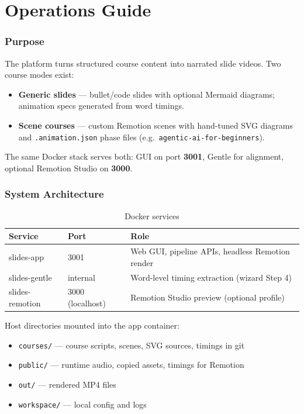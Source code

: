 \documentclass{scinexus}
\newcommand{\tableheadrow}[1]{\sffamily\bfseries\color{rbnavy} #1}
\begin{document}
\part{Operations Guide}

\section{Purpose}

The platform turns structured course content into narrated slide videos. Two course modes exist:

\begin{itemize}
	\item \textbf{Generic slides} --- bullet/code slides with optional Mermaid diagrams; animation specs generated from word timings.
	\item \textbf{Scene courses} --- custom Remotion scenes with hand-tuned SVG diagrams and \texttt{.animation.json} phase files (e.g.\ \texttt{agentic-ai-for-beginners}).
\end{itemize}

The same Docker stack serves both: GUI on port \textbf{3001}, Gentle for alignment, optional Remotion Studio on \textbf{3000}.

\section{System Architecture}

\diagramSystemArchitecture

\begin{table}[htbp]
	\centering
	\footnotesize
	\caption{Docker services}
	\label{tab:services}
	\begin{tabularx}{\textwidth}{@{}l l L@{}}
		\toprule
		\tableheadrow{Service} & \tableheadrow{Port} & \tableheadrow{Role} \\
		\midrule
		slides-app & 3001 & Web GUI, pipeline APIs, headless Remotion render \\
		slides-gentle & internal & Word-level timing extraction (wizard Step 4) \\
		slides-remotion & 3000 (localhost) & Remotion Studio preview (optional profile) \\
		\bottomrule
	\end{tabularx}
\end{table}

Host directories mounted into the app container:

\begin{itemize}
	\item \texttt{courses/} --- course scripts, scenes, SVG sources, timings in git
	\item \texttt{public/} --- runtime audio, copied assets, timings for Remotion
	\item \texttt{out/} --- rendered MP4 files
	\item \texttt{workspace/} --- local config and logs
\end{itemize}
\end{document}
